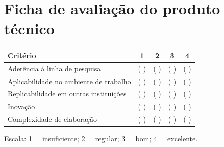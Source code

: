 \chapter{Ficha de avaliação do produto técnico}
\label{an:ficha}


\begin{table}[htb]
  \centering
  \small
  \begin{tabularx}{\textwidth}{Xcccc}
    \toprule
    \textbf{Critério} & \textbf{1} & \textbf{2} & \textbf{3} & \textbf{4} \\
    \midrule
    Aderência à linha de pesquisa & ( ) & ( ) & ( ) & ( ) \\
    Aplicabilidade no ambiente de trabalho & ( ) & ( ) & ( ) & ( ) \\
    Replicabilidade em outras instituições & ( ) & ( ) & ( ) & ( ) \\
    Inovação & ( ) & ( ) & ( ) & ( ) \\
    Complexidade de elaboração & ( ) & ( ) & ( ) & ( ) \\
    \bottomrule
  \end{tabularx}
\end{table}

\noindent Escala: 1 = insuficiente; 2 = regular; 3 = bom; 4 = excelente.
